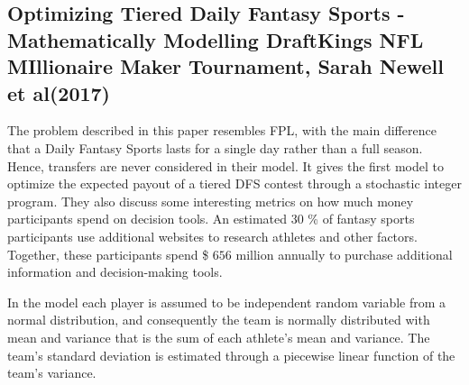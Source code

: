 \begin{comment}
LITERATURE STUDY 
The growth of fantasy sports has made it an important part of the sports industry. The booming popularity
also stimulated research on fantasy sports and from 2005 on literature on fantasy sports really started to
grow. Two directions of research are currently dominant. The first line of research is economically oriented.
It sees fantasy sports as a new form of sport consumption and studies how this affects the behavior of sports
fans. Randle & Nyland (2008), Drayer et al. (2010) and Karg & McDonald (2011) all take a rather global
view and look at the impact of fantasy sport participation on the various media sources fantasy sport
participants use. The specific impact of fantasy sport on television ratings is analyzed by Nesbit & King
(2010), Dwyer (2011a) and Fortunato (2011), while the live attendance impact is taken up by Nesbit & King
(2011). Most of these studies basically conclude that instead of competing with traditional ways of sport
consumption, fantasy sport appears to be a complementary and value-adding activity (Dwyer, 2011a). Fan
loyalty and how fantasy sports can be used in customer relationship management are studied by Dwyer
(2011b) and Smith, Synowka & Smith (2010).
\end{comment}


\subsection{Optimizing Tiered Daily Fantasy Sports - Mathematically Modelling DraftKings NFL MIllionaire Maker Tournament, Sarah Newell et al(2017)}

The problem described in this paper resembles FPL, with the main difference that a Daily Fantasy Sports lasts for a single day rather than a full season. Hence, transfers are never considered in their model. It gives the first model to optimize the expected payout of a tiered DFS contest through a stochastic integer program. They also discuss some interesting metrics on how much money participants spend on decision tools. An estimated 30 \% of fantasy sports participants use additional websites to research athletes and other factors. Together, these participants spend \$ $656$ million annually to purchase additional information and decision-making tools. 

\newpar

In the model each player is assumed to be independent random variable from a normal distribution, and consequently the team is normally distributed with mean and variance that is the sum of each athlete's mean and variance. The team's standard deviation is estimated through a piecewise linear function of the team's variance. 
\begin{comment}
INSPO: 
Approximately 56.8 million people worldwide played fantasy sports in 2015 [1]. The fantasy sports industry is
expected to grow annually by 41%
participants has impacted the sports industry positively, as research shows that fantasy sport participation increases
game attendance and sports media viewership [3].
\end{comment}


